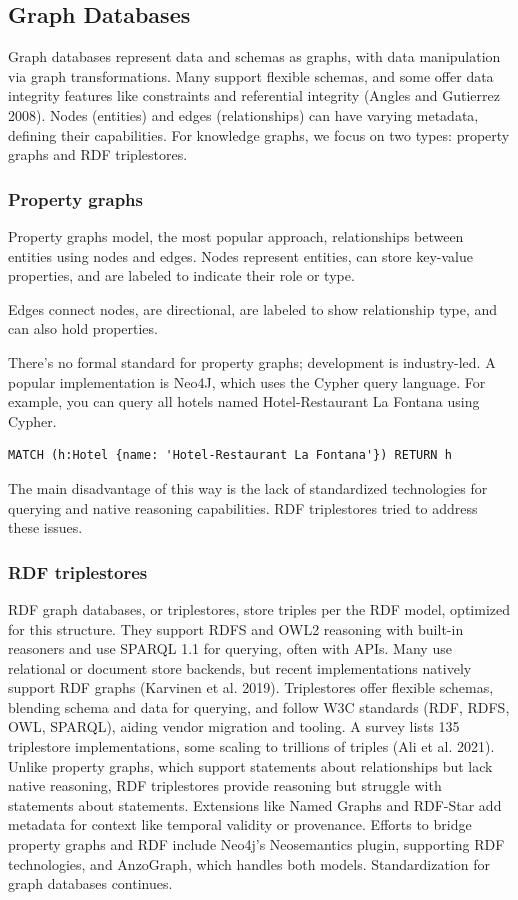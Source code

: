 \documentclass[12pt]{article}
\begin{document}
\subsection{Graph Databases}
Graph databases represent data and schemas as graphs, with data manipulation via graph transformations. Many support flexible schemas, and some offer data integrity features like constraints and referential integrity (Angles and Gutierrez 2008). Nodes (entities) and edges (relationships) can have varying metadata, defining their capabilities. For knowledge graphs, we focus on two types: property graphs and RDF triplestores.
\subsubsection{Property graphs}
Property graphs model, the most popular approach, relationships between entities using nodes and edges.
Nodes represent entities, can store key-value properties, and are labeled to indicate their role or type.

Edges connect nodes, are directional, are labeled to show relationship type, and can also hold properties.

There’s no formal standard for property graphs; development is industry-led. A popular implementation is Neo4J, which uses the Cypher query language. For example, you can query all hotels named Hotel-Restaurant La Fontana using Cypher.
\begin{verbatim}
MATCH (h:Hotel {name: 'Hotel-Restaurant La Fontana'}) RETURN h
\end{verbatim}
The main disadvantage of this way is the lack of standardized technologies for querying and native reasoning capabilities. RDF triplestores tried to address these issues.
\subsubsection{RDF triplestores}
RDF graph databases, or triplestores, store triples per the RDF model, optimized for this structure. They support RDFS and OWL2 reasoning with built-in reasoners and use SPARQL 1.1 for querying, often with APIs. Many use relational or document store backends, but recent implementations natively support RDF graphs (Karvinen et al. 2019). Triplestores offer flexible schemas, blending schema and data for querying, and follow W3C standards (RDF, RDFS, OWL, SPARQL), aiding vendor migration and tooling. A survey lists 135 triplestore implementations, some scaling to trillions of triples (Ali et al. 2021). Unlike property graphs, which support statements about relationships but lack native reasoning, RDF triplestores provide reasoning but struggle with statements about statements. Extensions like Named Graphs and RDF-Star add metadata for context like temporal validity or provenance. Efforts to bridge property graphs and RDF include Neo4j's Neosemantics plugin, supporting RDF technologies, and AnzoGraph, which handles both models. Standardization for graph databases continues.
\end{document}
